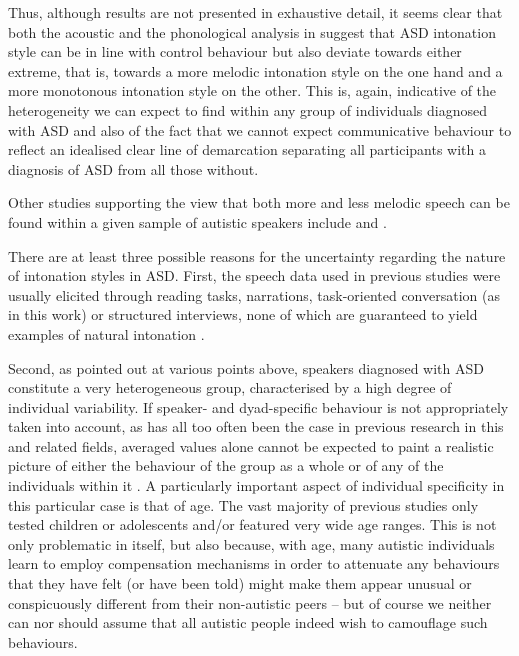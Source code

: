 Thus, although results are not presented in exhaustive detail, it seems clear that both the acoustic and the phonological analysis in \citet{greenProsodicAnalysisDifficult2009} suggest that ASD intonation style can be in line with control behaviour but also deviate towards either extreme, that is, towards a more melodic intonation style on the one hand and a more monotonous intonation style on the other. This is, again, indicative of the heterogeneity we can expect to find within any group of individuals diagnosed with ASD and also of the fact that we cannot expect communicative behaviour to reflect an idealised clear line of demarcation separating all participants with a diagnosis of ASD from all those without.

Other studies supporting the view that both more and less melodic speech can be found within a given sample of autistic speakers include \citet{baltaxeUseContrastiveStress1984,rapinAutisticChildrenDiagnosis1991} and \citet{depapeUseProsodyInformation2012}.

	\label{int_back_causes}

There are at least three possible reasons for the uncertainty regarding the nature of intonation styles in ASD. First, the speech data used in previous studies were usually elicited through reading tasks, narrations, task-oriented conversation (as in this work) or structured interviews, none of which are guaranteed to yield examples of natural intonation \citep{deruiterInformationStatusMarking2015,griceIntonationQuestionsBari1997,spaniolMultimodalSignallingInterplay2023,kuglerDIMA2015}.

Second, as pointed out at various points above, speakers diagnosed with ASD constitute a very heterogeneous group, characterised by a high degree of individual variability. If speaker- and dyad-specific behaviour is not appropriately taken into account, as has all too often been the case in previous research in this and related fields, averaged values alone cannot be expected to paint a realistic picture of either the behaviour of the group as a whole or of any of the individuals within it \citep[cf.][]{cangemiSpeakerspecificIntonationalMarking2016}. A particularly important aspect of individual specificity in this particular case is that of age. The vast majority of previous studies only tested children or adolescents and/or featured very wide age ranges. This is not only problematic in itself, but also because, with age, many autistic individuals learn to employ compensation mechanisms in order to attenuate any behaviours that they have felt (or have been told) might make them appear unusual or conspicuously different from their non-autistic peers -- but of course we neither can nor should assume that all autistic people indeed wish to camouflage such behaviours.

